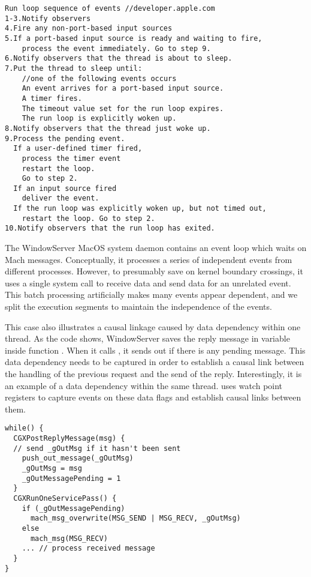 {\footnotesize \begin{verbatim}
Run loop sequence of events //developer.apple.com
1-3.Notify observers
4.Fire any non-port-based input sources
5.If a port-based input source is ready and waiting to fire,
    process the event immediately. Go to step 9.
6.Notify observers that the thread is about to sleep.
7.Put the thread to sleep until:
    //one of the following events occurs
    An event arrives for a port-based input source.
    A timer fires.
    The timeout value set for the run loop expires.
    The run loop is explicitly woken up.
8.Notify observers that the thread just woke up.
9.Process the pending event.
  If a user-defined timer fired,
    process the timer event
    restart the loop.
    Go to step 2.
  If an input source fired
    deliver the event.
  If the run loop was explicitly woken up, but not timed out,
    restart the loop. Go to step 2.
10.Notify observers that the run loop has exited.

\end{verbatim}
}

The WindowServer MacOS system daemon contains an event loop which waits on
Mach messages. Conceptually, it processes a series of independent events from
different processes. However, to presumably save on kernel boundary crossings,
it uses a single system call to receive data and send data for an unrelated
event. This batch processing artificially makes many events appear dependent,
and we split the execution segments to maintain the independence of the events.

This case also illustrates a causal linkage caused by data dependency within
one thread. As the code shows, WindowServer saves the reply message in variable
 inside function . When it calls
, it sends out  if there is any pending
message. This data dependency needs to be captured in order to establish a
causal link between the handling of the previous request and the send of the
reply. Interestingly, it is an example of a data dependency within the same
thread. \xxx uses watch point registers to capture events on these data flags
and establish causal links between them.

{\footnotesize \begin{verbatim}
while() {
  CGXPostReplyMessage(msg) {
  // send _gOutMsg if it hasn't been sent
    push_out_message(_gOutMsg)
    _gOutMsg = msg
    _gOutMessagePending = 1
  }
  CGXRunOneServicePass() {
    if (_gOutMessagePending)
      mach_msg_overwrite(MSG_SEND | MSG_RECV, _gOutMsg)
    else
      mach_msg(MSG_RECV)
    ... // process received message
  }
}
\end{verbatim}
}

